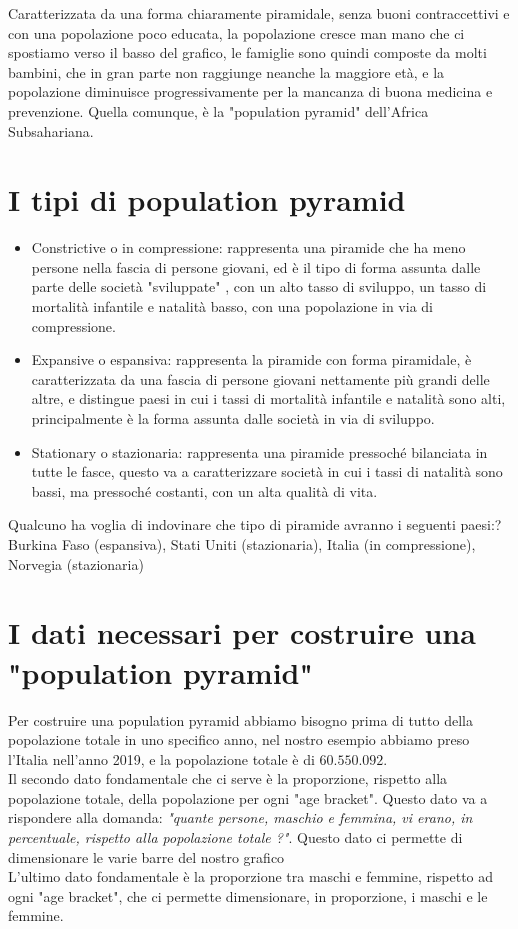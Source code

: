 \documentclass[11pt, oneside]{article}
\begin{document}
Caratterizzata da una forma chiaramente piramidale, senza buoni contraccettivi e con una popolazione poco educata, la popolazione cresce man mano che ci spostiamo verso il basso del grafico, le famiglie sono quindi composte da molti bambini, che in gran parte non raggiunge neanche la maggiore età, e la popolazione diminuisce progressivamente per la mancanza di buona medicina e prevenzione. Quella comunque, è la "population pyramid" dell'Africa Subsahariana.


\section{I tipi di population pyramid}
\begin{itemize}
\item Constrictive o in compressione: rappresenta una piramide che ha meno persone nella fascia di persone giovani, ed è il tipo di forma assunta dalle parte delle società "sviluppate" , con un alto tasso di sviluppo, un tasso di mortalità infantile e natalità basso, con una popolazione in via di compressione.
\item Expansive o espansiva: rappresenta la piramide con forma piramidale, è caratterizzata da una fascia di persone giovani nettamente più grandi delle altre, e distingue paesi in cui i tassi di mortalità infantile e natalità sono alti, principalmente è la forma assunta dalle società in via di sviluppo.
\item Stationary o stazionaria: rappresenta una piramide pressoché bilanciata in tutte le fasce, questo va a caratterizzare società in cui i tassi di natalità sono bassi, ma pressoché costanti, con un alta qualità di vita.
\end{itemize}
\footnotesize{}
Qualcuno ha voglia di indovinare che tipo di piramide avranno i seguenti paesi:?
Burkina Faso (espansiva), Stati Uniti (stazionaria), Italia (in compressione), Norvegia (stazionaria)

\normalsize{}

\begin{center}
\end{center}

\section{I dati necessari per costruire una "population pyramid"}
Per costruire una population pyramid abbiamo bisogno prima di tutto della popolazione totale in uno specifico anno, nel nostro esempio abbiamo preso l'Italia nell'anno 2019, e la popolazione totale è di $60.550.092$. \\
Il secondo dato fondamentale che ci serve è la proporzione, rispetto alla popolazione totale, della popolazione per ogni "age bracket". Questo dato va a rispondere alla domanda: \emph{"quante persone, maschio e femmina, vi erano, in percentuale, rispetto alla popolazione totale ?"}. Questo dato ci permette di dimensionare le varie barre del nostro grafico\\
L'ultimo dato fondamentale è la proporzione tra maschi e femmine, rispetto ad ogni "age bracket", che ci permette dimensionare, in proporzione, i maschi e le femmine.
\end{document}
